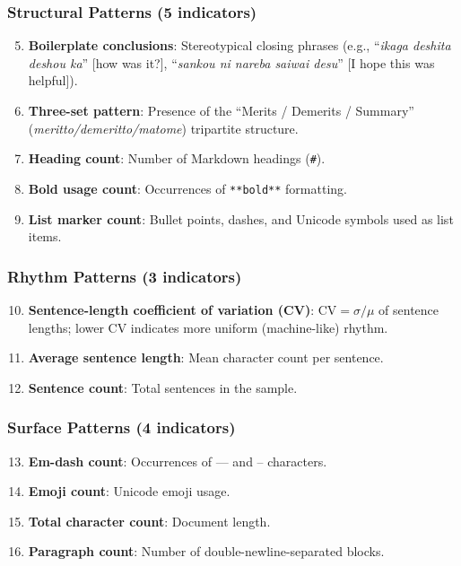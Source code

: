 \documentclass[11pt,a4paper]{article}
\begin{document}
\subsubsection{Structural Patterns (5 indicators)}
\begin{enumerate}
    \setcounter{enumi}{4}
    \item \textbf{Boilerplate conclusions}: Stereotypical closing phrases (e.g., ``\textit{ikaga deshita deshou ka}'' [how was it?], ``\textit{sankou ni nareba saiwai desu}'' [I hope this was helpful]).
    \item \textbf{Three-set pattern}: Presence of the ``Merits / Demerits / Summary'' (\textit{meritto/demeritto/matome}) tripartite structure.
    \item \textbf{Heading count}: Number of Markdown headings (\texttt{\#}).
    \item \textbf{Bold usage count}: Occurrences of \texttt{**bold**} formatting.
    \item \textbf{List marker count}: Bullet points, dashes, and Unicode symbols used as list items.
\end{enumerate}

\subsubsection{Rhythm Patterns (3 indicators)}
\begin{enumerate}
    \setcounter{enumi}{9}
    \item \textbf{Sentence-length coefficient of variation (CV)}: $\text{CV} = \sigma / \mu$ of sentence lengths; lower CV indicates more uniform (machine-like) rhythm.
    \item \textbf{Average sentence length}: Mean character count per sentence.
    \item \textbf{Sentence count}: Total sentences in the sample.
\end{enumerate}

\subsubsection{Surface Patterns (4 indicators)}
\begin{enumerate}
    \setcounter{enumi}{12}
    \item \textbf{Em-dash count}: Occurrences of --- and -- characters.
    \item \textbf{Emoji count}: Unicode emoji usage.
    \item \textbf{Total character count}: Document length.
    \item \textbf{Paragraph count}: Number of double-newline-separated blocks.
\end{enumerate}
\end{document}
